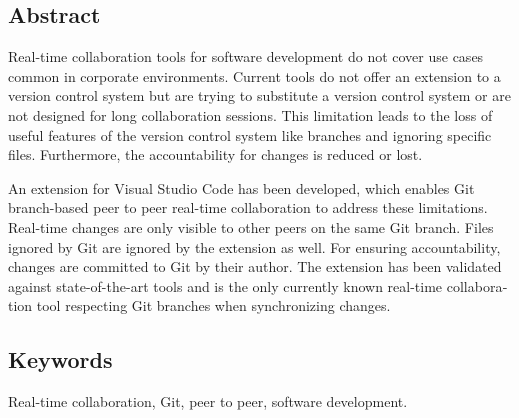 
\begin{otherlanguage}{english}

  \chapter*{Abstract}

  Real-time collaboration tools for software development do not cover use cases common in corporate environments. Current tools do not offer an extension to a version control system but are trying to substitute a version control system or are not designed for long collaboration sessions. This limitation leads to the loss of useful features of the version control system like branches and ignoring specific files. Furthermore, the accountability for changes is reduced or lost.

  An extension for Visual Studio Code has been developed, which enables Git branch-based peer to peer real-time collaboration to address these limitations. Real-time changes are only visible to other peers on the same Git branch. Files ignored by Git are ignored by the extension as well. For ensuring accountability, changes are committed to Git by their author. The extension has been validated against state-of-the-art tools and is the only currently known real-time collaboration tool respecting Git branches when synchronizing changes.

  \bigskip

  \section*{Keywords}
  Real-time collaboration, Git, peer to peer, software development.

\end{otherlanguage}
